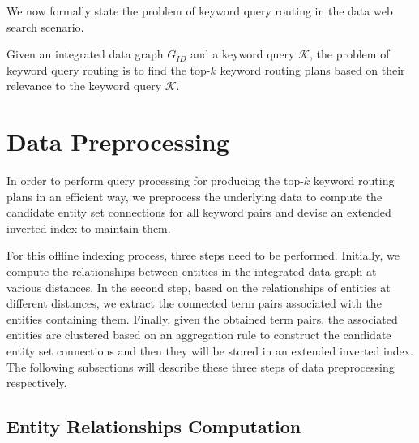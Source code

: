 We now formally state the problem of keyword query routing in the data web search scenario. 
\begin{problem}
Given an integrated data graph $G_{ID}$ and a keyword query $\mathcal{K}$, the problem of keyword
query routing is to find the top-$k$ keyword routing plans based on their relevance to the keyword
query $\mathcal{K}$.
\end{problem}

\section{Data Preprocessing}\label{qr:preprocessing}

In order to perform query processing for producing the top-$k$ keyword routing plans in an efficient
way, we preprocess the underlying data to compute the candidate entity set connections for all
keyword pairs and devise an extended inverted index to maintain them.

For this offline indexing process, three steps need to be performed. Initially, we compute the
relationships between entities in the integrated data graph at various distances. In the second step,
based on the relationships of entities at different distances, we extract the connected term pairs
associated with the entities containing them. Finally, given the obtained term pairs, the associated
entities are clustered based on an aggregation rule to construct the candidate entity set connections
and then they will be stored in an extended inverted index. The following subsections will describe
these three steps of data preprocessing respectively. 

\subsection{Entity Relationships Computation}

